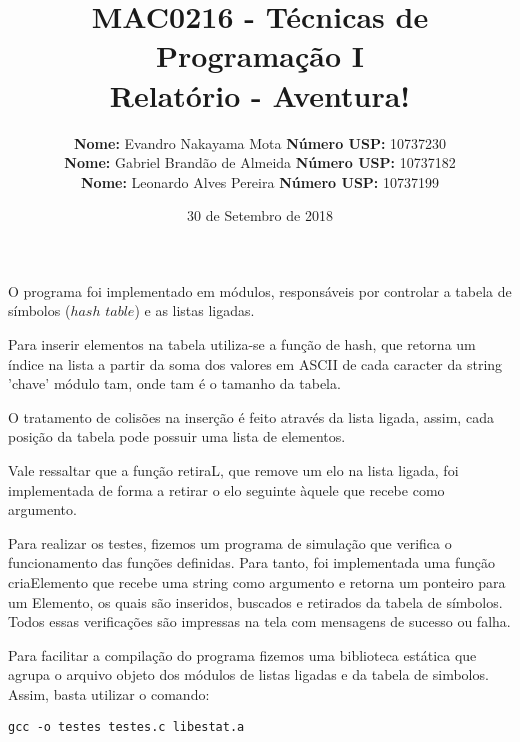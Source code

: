 \documentclass[12pt]{article}
\title{
\textbf{MAC0216 - Técnicas de Programação I \\ Relatório - Aventura! }
}
\author{
\textbf{Nome:} Evandro Nakayama Mota 
\hspace{2cm}
\textbf{Número USP:} 10737230 \\
\textbf{Nome:} Gabriel Brandão de Almeida
\hfill
\textbf{Número USP:} 10737182 \\
\textbf{Nome:} Leonardo Alves Pereira
\hfill
\textbf{Número USP:} 10737199 \\
}
\date {30 de Setembro de 2018}
\begin{document}
\maketitle
\thispagestyle{empty}

O programa foi implementado em módulos, responsáveis por controlar a tabela de símbolos ($hash$ $table$) e as listas ligadas.

Para inserir elementos na tabela utiliza-se a função de hash, que retorna um índice na lista a partir da soma dos valores em ASCII de cada caracter da string 'chave' módulo tam, onde tam é o tamanho da tabela. 

O tratamento de colisões na inserção é feito através da lista ligada, assim, cada posição da tabela pode possuir uma lista de elementos.

Vale ressaltar que a função retiraL, que remove um elo na lista ligada, foi implementada de forma a retirar o elo seguinte àquele que recebe como argumento.

Para realizar os testes, fizemos um programa de simulação que verifica o funcionamento das funções definidas. Para tanto, foi implementada uma função criaElemento que recebe uma string como argumento e retorna um ponteiro para um Elemento, os quais são inseridos, buscados e retirados da tabela de símbolos. Todos essas verificações são impressas na tela com mensagens de sucesso ou falha.

Para facilitar a compilação do programa fizemos uma biblioteca estática que agrupa o arquivo objeto dos módulos de listas ligadas e da tabela de simbolos. Assim, basta utilizar o comando:


\begin{verbatim}
gcc -o testes testes.c libestat.a
\end{verbatim}
\end{document}
